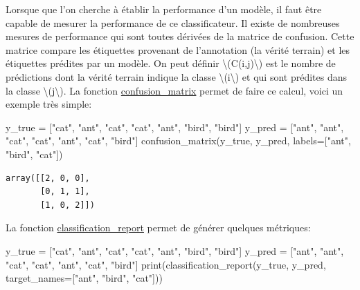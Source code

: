 \documentclass[
]{article}
\newenvironment{Shaded}{}{}
\newcommand{\BuiltInTok}[1]{\textcolor[rgb]{0.00,0.50,0.00}{#1}}
\newcommand{\NormalTok}[1]{#1}
\newcommand{\OperatorTok}[1]{\textcolor[rgb]{0.40,0.40,0.40}{#1}}
\newcommand{\StringTok}[1]{\textcolor[rgb]{0.25,0.44,0.63}{#1}}
\begin{document}
Lorsque que l'on cherche à établir la performance d'un modèle, il faut
être capable de mesurer la performance de ce classificateur. Il existe
de nombreuses mesures de performance qui sont toutes dérivées de la
matrice de confusion. Cette matrice compare les étiquettes provenant de
l'annotation (la vérité terrain) et les étiquettes prédites par un
modèle. On peut définir {\textbackslash(C(i,j)\textbackslash)} est le
nombre de prédictions dont la vérité terrain indique la classe
{\textbackslash(i\textbackslash)} et qui sont prédites dans la classe
{\textbackslash(j\textbackslash)}. La fonction
\href{https://scikit-learn.org/stable/modules/generated/sklearn.metrics.confusion_matrix.html}{confusion\_matrix}
permet de faire ce calcul, voici un exemple très simple:

\label{288f180e}
\label{cb16}
\begin{Shaded}
\begin{Highlighting}[]
\NormalTok{y\_true }\OperatorTok{=}\NormalTok{ [}\StringTok{"cat"}\NormalTok{, }\StringTok{"ant"}\NormalTok{, }\StringTok{"cat"}\NormalTok{, }\StringTok{"cat"}\NormalTok{, }\StringTok{"ant"}\NormalTok{, }\StringTok{"bird"}\NormalTok{, }\StringTok{"bird"}\NormalTok{]}
\NormalTok{y\_pred }\OperatorTok{=}\NormalTok{ [}\StringTok{"ant"}\NormalTok{, }\StringTok{"ant"}\NormalTok{, }\StringTok{"cat"}\NormalTok{, }\StringTok{"cat"}\NormalTok{, }\StringTok{"ant"}\NormalTok{, }\StringTok{"cat"}\NormalTok{, }\StringTok{"bird"}\NormalTok{]}
\NormalTok{confusion\_matrix(y\_true, y\_pred, labels}\OperatorTok{=}\NormalTok{[}\StringTok{"ant"}\NormalTok{, }\StringTok{"bird"}\NormalTok{, }\StringTok{"cat"}\NormalTok{])}
\end{Highlighting}
\end{Shaded}

\begin{verbatim}
array([[2, 0, 0],
       [0, 1, 1],
       [1, 0, 2]])
\end{verbatim}

La fonction
\href{https://scikit-learn.org/stable/modules/generated/sklearn.metrics.classification_report.html\#sklearn.metrics.classification_report}{classification\_report}
permet de générer quelques métriques:

\label{8947a753}
\label{cb18}
\begin{Shaded}
\begin{Highlighting}[]
\NormalTok{y\_true }\OperatorTok{=}\NormalTok{ [}\StringTok{"cat"}\NormalTok{, }\StringTok{"ant"}\NormalTok{, }\StringTok{"cat"}\NormalTok{, }\StringTok{"cat"}\NormalTok{, }\StringTok{"ant"}\NormalTok{, }\StringTok{"bird"}\NormalTok{, }\StringTok{"bird"}\NormalTok{]}
\NormalTok{y\_pred }\OperatorTok{=}\NormalTok{ [}\StringTok{"ant"}\NormalTok{, }\StringTok{"ant"}\NormalTok{, }\StringTok{"cat"}\NormalTok{, }\StringTok{"cat"}\NormalTok{, }\StringTok{"ant"}\NormalTok{, }\StringTok{"cat"}\NormalTok{, }\StringTok{"bird"}\NormalTok{]}
\BuiltInTok{print}\NormalTok{(classification\_report(y\_true, y\_pred, target\_names}\OperatorTok{=}\NormalTok{[}\StringTok{"ant"}\NormalTok{, }\StringTok{"bird"}\NormalTok{, }\StringTok{"cat"}\NormalTok{]))}
\end{Highlighting}
\end{Shaded}
\end{document}

